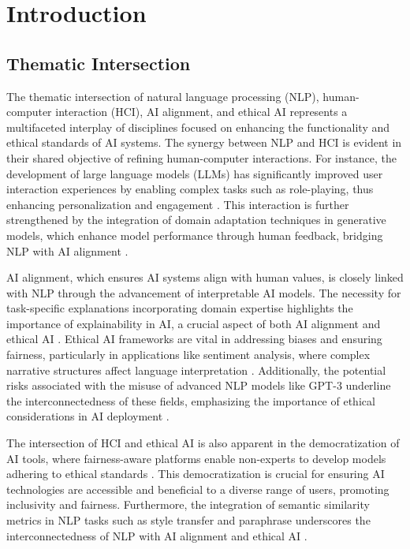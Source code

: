 \section{Introduction} \label{sec:Introduction}


\subsection{Thematic Intersection} \label{subsec:Thematic Intersection}

The thematic intersection of natural language processing (NLP), human-computer interaction (HCI), AI alignment, and ethical AI represents a multifaceted interplay of disciplines focused on enhancing the functionality and ethical standards of AI systems. The synergy between NLP and HCI is evident in their shared objective of refining human-computer interactions. For instance, the development of large language models (LLMs) has significantly improved user interaction experiences by enabling complex tasks such as role-playing, thus enhancing personalization and engagement \cite{tao2024rolecraftglmadvancingpersonalizedroleplaying}. This interaction is further strengthened by the integration of domain adaptation techniques in generative models, which enhance model performance through human feedback, bridging NLP with AI alignment \cite{wang2019pairedopenendedtrailblazerpoet}.



AI alignment, which ensures AI systems align with human values, is closely linked with NLP through the advancement of interpretable AI models. The necessity for task-specific explanations incorporating domain expertise highlights the importance of explainability in AI, a crucial aspect of both AI alignment and ethical AI \cite{chiaburu2024copronnconceptbasedprototypicalnearest}. Ethical AI frameworks are vital in addressing biases and ensuring fairness, particularly in applications like sentiment analysis, where complex narrative structures affect language interpretation \cite{jannidis2016analyzingfeaturesdetectionhappy}. Additionally, the potential risks associated with the misuse of advanced NLP models like GPT-3 underline the interconnectedness of these fields, emphasizing the importance of ethical considerations in AI deployment \cite{mcguffie2020radicalizationrisksgpt3advanced}.



The intersection of HCI and ethical AI is also apparent in the democratization of AI tools, where fairness-aware platforms enable non-experts to develop models adhering to ethical standards \cite{palmini2024patternscreativityuserinput}. This democratization is crucial for ensuring AI technologies are accessible and beneficial to a diverse range of users, promoting inclusivity and fairness. Furthermore, the integration of semantic similarity metrics in NLP tasks such as style transfer and paraphrase underscores the interconnectedness of NLP with AI alignment and ethical AI \cite{yamshchikov2020styletransferparaphraselookingsensible}.



